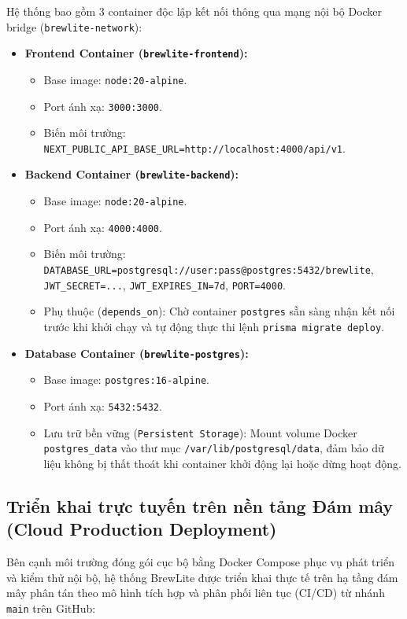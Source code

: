 \documentclass[12pt,a4paper,oneside]{report}
\begin{document}
Hệ thống bao gồm 3 container độc lập kết nối thông qua mạng nội bộ Docker bridge (\texttt{brewlite-network}):
\begin{itemize}
    \item \textbf{Frontend Container (\texttt{brewlite-frontend}):}
    \begin{itemize}
        \item Base image: \texttt{node:20-alpine}.
        \item Port ánh xạ: \texttt{3000:3000}.
        \item Biến môi trường: \texttt{NEXT\_PUBLIC\_API\_BASE\_URL=http://localhost:4000/api/v1}.
    \end{itemize}
    \item \textbf{Backend Container (\texttt{brewlite-backend}):}
    \begin{itemize}
        \item Base image: \texttt{node:20-alpine}.
        \item Port ánh xạ: \texttt{4000:4000}.
        \item Biến môi trường: \texttt{DATABASE\_URL=postgresql://user:pass@postgres:5432/brewlite}, \texttt{JWT\_SECRET=...}, \texttt{JWT\_EXPIRES\_IN=7d}, \texttt{PORT=4000}.
        \item Phụ thuộc (\texttt{depends\_on}): Chờ container \texttt{postgres} sẵn sàng nhận kết nối trước khi khởi chạy và tự động thực thi lệnh \texttt{prisma migrate deploy}.
    \end{itemize}
    \item \textbf{Database Container (\texttt{brewlite-postgres}):}
    \begin{itemize}
        \item Base image: \texttt{postgres:16-alpine}.
        \item Port ánh xạ: \texttt{5432:5432}.
        \item Lưu trữ bền vững (\texttt{Persistent Storage}): Mount volume Docker \texttt{postgres\_data} vào thư mục \texttt{/var/lib/postgresql/data}, đảm bảo dữ liệu không bị thất thoát khi container khởi động lại hoặc dừng hoạt động.
    \end{itemize}
\end{itemize}

\subsection{Triển khai trực tuyến trên nền tảng Đám mây (Cloud Production Deployment)}
Bên cạnh môi trường đóng gói cục bộ bằng Docker Compose phục vụ phát triển và kiểm thử nội bộ, hệ thống BrewLite được triển khai thực tế trên hạ tầng đám mây phân tán theo mô hình tích hợp và phân phối liên tục (CI/CD) từ nhánh \texttt{main} trên GitHub:
\end{document}
